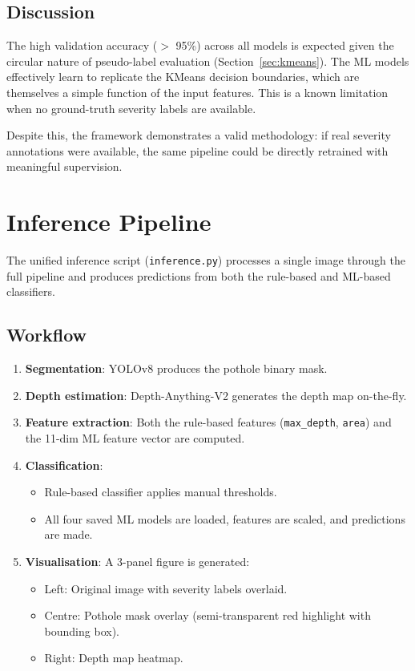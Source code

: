 \documentclass[12pt, a4paper]{article}
\begin{document}
\subsection{Discussion}

The high validation accuracy ($>$ 95\%) across all models is expected given the circular nature of pseudo-label evaluation (Section~\ref{sec:kmeans}). The ML models effectively learn to replicate the KMeans decision boundaries, which are themselves a simple function of the input features. This is a known limitation when no ground-truth severity labels are available.

Despite this, the framework demonstrates a valid methodology: if real severity annotations were available, the same pipeline could be directly retrained with meaningful supervision.

\section{Inference Pipeline}
\label{sec:inference}

The unified inference script (\texttt{inference.py}) processes a single image through the full pipeline and produces predictions from both the rule-based and ML-based classifiers.

\subsection{Workflow}

\begin{enumerate}
    \item \textbf{Segmentation}: YOLOv8 produces the pothole binary mask.
    \item \textbf{Depth estimation}: Depth-Anything-V2 generates the depth map on-the-fly.
    \item \textbf{Feature extraction}: Both the rule-based features (\texttt{max\_depth}, \texttt{area}) and the 11-dim ML feature vector are computed.
    \item \textbf{Classification}:
    \begin{itemize}
        \item Rule-based classifier applies manual thresholds.
        \item All four saved ML models are loaded, features are scaled, and predictions are made.
    \end{itemize}
    \item \textbf{Visualisation}: A 3-panel figure is generated:
    \begin{itemize}
        \item Left: Original image with severity labels overlaid.
        \item Centre: Pothole mask overlay (semi-transparent red highlight with bounding box).
        \item Right: Depth map heatmap.
    \end{itemize}
\end{enumerate}
\end{document}
